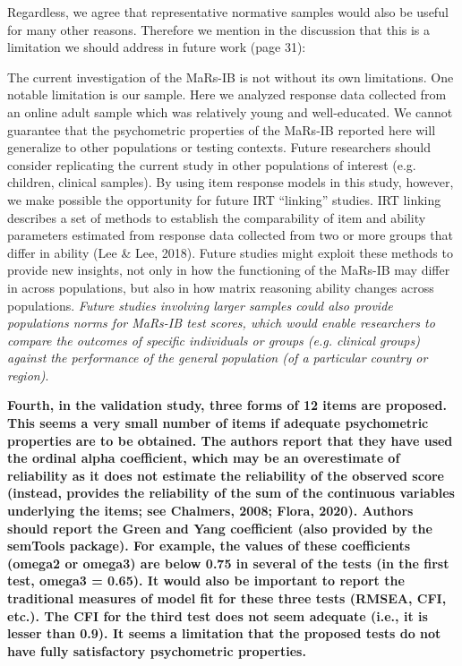\documentclass[a4paper,notitlepage,12pt]{article}
\begin{document}
Regardless, we agree that representative normative samples would also be useful for many other reasons. Therefore we mention in the discussion that this is a limitation we should address in future work (page 31):

\begin{displayquote}
The current investigation of the MaRs-IB is not without its own limitations. One notable limitation is our sample. Here we analyzed response data collected from an online adult sample which was relatively young and well-educated. We cannot guarantee that the psychometric properties of the MaRs-IB reported here will generalize to other populations or testing contexts. Future researchers should consider replicating the current study in other populations of interest (e.g. children, clinical samples). By using item response models in this study, however, we make possible the opportunity for future IRT ``linking'' studies. IRT linking describes a set of methods to establish the comparability of item and ability parameters estimated from response data collected from two or more groups that differ in ability (Lee \& Lee, 2018). Future studies might exploit these methods to provide new insights, not only in how the functioning of the MaRs-IB may differ in across populations, but also in how matrix reasoning ability changes across populations. \textit{Future studies involving larger samples could also provide populations norms for MaRs-IB test scores, which would enable researchers to compare the outcomes of specific individuals or groups (e.g. clinical groups) against the performance of the general population (of a particular country or region)}.
\end{displayquote}


\textbf{Fourth, in the validation study, three forms of 12 items are proposed. This seems a very small number of items if adequate psychometric properties are to be obtained. The authors report that they have used the ordinal alpha coefficient, which may be an overestimate of reliability as it does not estimate the reliability of the observed score (instead, provides the reliability of the sum of the continuous variables underlying the items; see Chalmers, 2008; Flora, 2020). Authors should report the Green and Yang coefficient (also provided by the semTools package). For example, the values of these coefficients (omega2 or omega3) are below 0.75 in several of the tests (in the first test, omega3 = 0.65). It would also be important to report the traditional measures of model fit for these three tests (RMSEA, CFI, etc.). The CFI for the third test does not seem adequate (i.e., it is lesser than 0.9). It seems a limitation that the proposed tests do not have fully satisfactory psychometric properties.}
\end{document}

